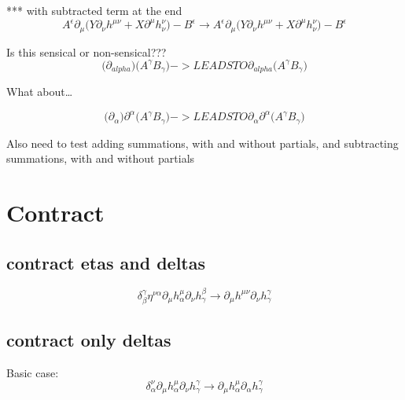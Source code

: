 \documentclass{article}
\def\){\Big)}
\def\({\Big(}
\begin{document}
*** with subtracted term at the end
\begin{equation}
A^{\epsilon} \partial_{\mu}  \(Y \partial_{\nu}h^{\mu \nu} + X \partial^{\mu} h^{\nu }_{\nu}\) - B^{\epsilon}  \rightarrow A^{\epsilon} \partial_{\mu}\(Y \partial_{\nu}h^{\mu \nu} +X \partial^{\mu}h_{\nu}^{\nu} \)- B^{\epsilon}
\end{equation}

{\color{blue}
Is this sensical or non-sensical???
\begin{equation}
\( \partial_{alpha} \) \(A^{\gamma}B_{\gamma}\) -> LEADS TO 
\partial_{alpha}\( A^{\gamma} B_{\gamma} \)
\end{equation}

What about…

\begin{equation}
\( \partial_{\alpha} \) \partial^{\alpha}\(A^{\gamma}B_{\gamma}\) -> LEADS TO
\partial_{\alpha}\partial^{\alpha}\( A^{\gamma} B_{\gamma} \)
\end{equation}
}

Also need to test adding summations, with and without partials, and subtracting summations, with and without partials\\




\section{Contract}


 \subsection{contract etas and deltas}
\begin{equation}
\delta^{\gamma}_{\beta} \eta^{\nu \alpha} \partial_{\mu} h^{\mu}_{\alpha}\partial_{\nu} h^{\beta}_{\gamma}  \rightarrow  \partial_{\mu}h^{\mu \nu} \partial_{\nu}h_{\gamma}^{\gamma}
\end{equation}


 \subsection{contract only deltas}

Basic case:
\begin{equation}
\delta^{\nu }_{\alpha} \partial_{\mu} h^{\mu}_{\alpha}\partial_{\nu} h^{\gamma}_{\gamma}  \rightarrow \partial_{\mu}h_{\alpha}^{\mu} \partial_{\alpha}h_{\gamma}^{\gamma}
\end{equation}
\end{document}
